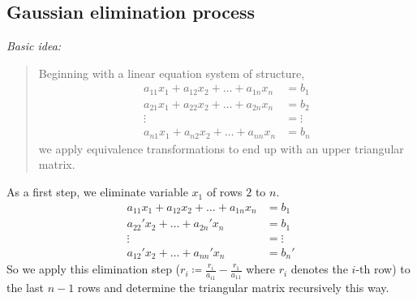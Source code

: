 \documentclass[a4paper]{article}
\numberwithin{lecref}{section}
\theoremstyle{break}
\begin{document}
\subsection{Gaussian elimination process}
\label{sec:1-2}

\emph{Basic idea:}
\begin{quote}
  Beginning with a linear equation system of structure,
  \begin{align}
    a_{11} x_1 + a_{12} x_2 + \dots + a_{1n} x_n &= b_1 \nonumber\\
    a_{21} x_1 + a_{22} x_2 + \dots + a_{2n} x_n &= b_2 \nonumber\\
    \vdots &= \vdots \nonumber\\
    a_{n1} x_1 + a_{n2} x_2 + \dots + a_{nn} x_n &= b_n
    \label{eq1}
  \end{align}
  we apply equivalence transformations to end up with an upper triangular matrix.
\end{quote}

As a first step, we eliminate variable $x_1$ of rows $2$ to $n$.
\begin{align}
  a_{11} x_1 + a_{12} x_2 + \dots + a_{1n} x_n &= b_1 \nonumber\\
    a_{22}' x_2 + \dots + a_{2n}' x_n &= b_1 \nonumber\\
      \vdots &= \vdots \nonumber\\
      a_{12}' x_2 + \dots + a_{nn}' x_n &= b_n'
  \label{eq2}
\end{align}
So we apply this elimination step ($r_i \coloneqq \frac{r_i}{a_{i1}} - \frac{r_1}{a_{11}}$ where $r_i$ denotes the $i$-th row) to the last $n-1$ rows and determine the triangular matrix recursively this way.
\end{document}

